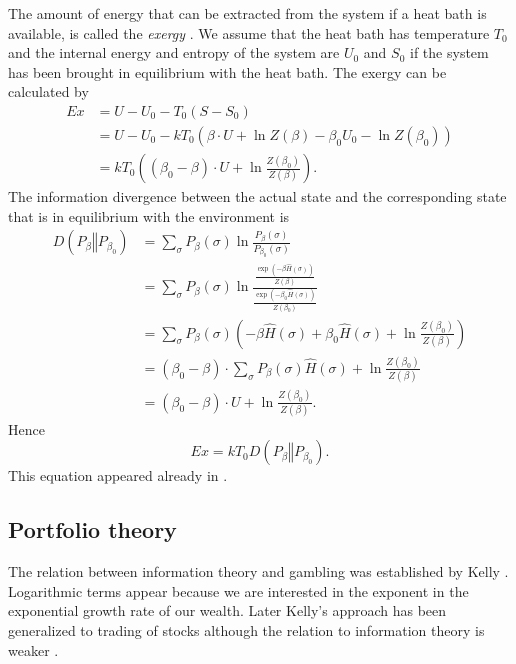 \documentclass[10pt,a4paper,draft]{article}
\begin{document}
The amount of energy that can be extracted from the system if a
heat bath is available, is called the \emph{exergy}
\cite{Gundersen2011a}. We assume
that the heat bath has temperature $T_0$ and the internal energy
and entropy of the system are $U_0$ and $S_0$ if the system has
been brought in
equilibrium with the heat bath. The exergy can be calculated by
\begin{align*}
Ex & =U-U_{0}-T_{0}\left(S-S_{0}\right)\\
& =U-U_{0}-kT_{0}\left(\beta\cdot U+\ln
Z\left(\beta\right)-\beta_{0}U_{0}-\ln
Z\left(\beta_{0}\right)\right)\\
& =kT_{0}\left(\left(\beta_{0}-\beta\right)\cdot
U+\ln\frac{Z\left(\beta_{0}\right)}{Z\left(\beta\right)}\right).
\end{align*}
The information divergence between the actual state and the
corresponding state that is in equilibrium with the environment is 
\begin{align*}
D\left(\left.P_{\beta}\right\Vert P_{\beta_{0}}\right) &
=\sum_{\sigma}P_{\beta}\left(\sigma\right)\ln\frac{P_{\beta}\left(\sigma\right)}{P_{\beta_{0}}\left(\sigma\right)}\\
&
=\sum_{\sigma}P_{\beta}\left(\sigma\right)\ln\frac{\frac{\exp\left(-\beta
\hat{H}\left(\sigma\right)\right)}{Z\left(\beta\right)}}{\frac{\exp\left(-\beta_{0}\hat{H}\left(\sigma\right)\right)}{Z\left(\beta_{0}\right)}}\\
& =\sum_{\sigma}P_{\beta}\left(\sigma\right)\left(-\beta
\hat{H}\left(\sigma\right)+\beta_{0}\hat{H}\left(\sigma\right)+\ln\frac{Z\left(\beta_{0}\right)}{Z\left(\beta\right)}\right)\\
&
=\left(\beta_{0}-\beta\right)\cdot\sum_{\sigma}P_{\beta}\left(\sigma\right)\hat{H}\left(\sigma\right)+\ln\frac{Z\left(\beta_{0}\right)}{Z\left(\beta\right)}\\
& =\left(\beta_{0}-\beta\right)\cdot
U+\ln\frac{Z\left(\beta_{0}\right)}{Z\left(\beta\right)}.
\end{align*}
Hence 
\[
Ex=kT_{0}D\left(\left.P_{\beta}\right\Vert P_{\beta_{0}}\right).\]
This equation appeared already in \cite{Harremoes1993}.

\subsection{Portfolio theory}

The relation between information theory and gambling was
established by Kelly \cite{Kelly1956}. Logarithmic terms appear because we
are interested in the exponent in the exponential growth rate of our
wealth. Later Kelly's approach has been generalized to trading of stocks
although the relation to information theory is weaker \cite{Cover1991}.
\end{document}
